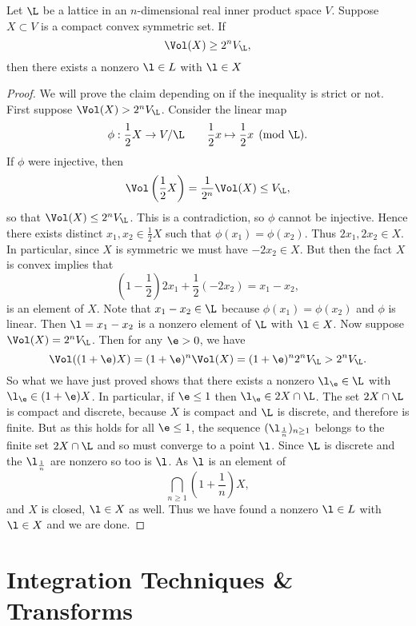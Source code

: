     \begin{theorem}
      Let $\L$ be a lattice in an $n$-dimensional real inner product space $V$. Suppose $X \subset V$ is a compact convex symmetric set. If
      \[
        \Vol(X) \ge 2^{n}V_{\L},
      \]
      then there exists a nonzero $\l \in L$ with $\l \in X$ 
    \end{theorem}
    \begin{proof}
      We will prove the claim depending on if the inequality is strict or not. First suppose $\Vol(X) > 2^{n}V_{\L}$. Consider the linear map
      \[
        \phi:\frac{1}{2}X \to V/\L \qquad \frac{1}{2}x \mapsto \frac{1}{2}x \pmod{\L}.
      \]
      If $\phi$ were injective, then
      \[
        \Vol\left(\frac{1}{2}X\right) = \frac{1}{2^{n}}\Vol(X) \le V_{\L}, 
      \]
      so that $\Vol(X) \le  2^{n}V_{\L}$. This is a contradiction, so $\phi$ cannot be injective. Hence there exists distinct $x_{1},x_{2} \in \frac{1}{2}X$ such that $\phi(x_{1}) = \phi(x_{2})$. Thus $2x_{1},2x_{2} \in X$. In particular, since $X$ is symmetric we must have $-2x_{2} \in X$. But then the fact $X$ is convex implies that
      \[
        \left(1-\frac{1}{2}\right)2x_{1}+\frac{1}{2}(-2x_{2}) = x_{1}-x_{2},
      \]
      is an element of $X$. Note that $x_{1}-x_{2} \in \L$ because $\phi(x_{1}) = \phi(x_{2})$ and $\phi$ is linear. Then $\l = x_{1}-x_{2}$ is a nonzero element of $\L$ with $\l \in X$. Now suppose $\Vol(X) = 2^{n}V_{\L}$. Then for any $\e > 0$, we have
      \[
        \Vol((1+\e)X) = (1+\e)^{n}\Vol(X) = (1+\e)^{n}2^{n}V_{\L} > 2^{n}V_{\L}.
      \]
      So what we have just proved shows that there exists a nonzero $\l_{\e} \in \L$ with $\l_{\e} \in (1+\e)X$. In particular, if $\e \le 1$ then $\l_{\e} \in 2X \cap \L$. The set $2X \cap \L$ is compact and discrete, because $X$ is compact and $\L$ is discrete, and therefore is finite. But as this holds for all $\e \le 1$, the sequence $(\l_{\frac{1}{n}})_{n \ge 1}$ belongs to the finite set $2X \cap \L$ and so must converge to a point $\l$. Since $\L$ is discrete and the $\l_{\frac{1}{n}}$ are nonzero so too is $\l$. As $\l$ is an element of
      \[
        \bigcap_{n \ge 1}\left(1+\frac{1}{n}\right)X,
      \]
      and $X$ is closed, $\l \in X$ as well. Thus we have found a nonzero $\l \in L$ with $\l \in X$ and we are done.
    \end{proof}
  \section{Integration Techniques \& Transforms}
